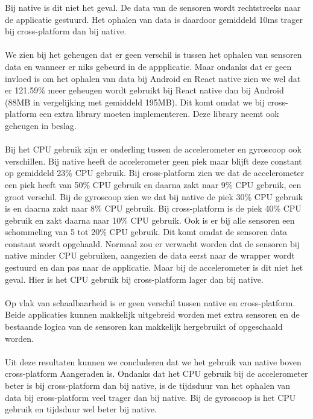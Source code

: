 Bij native is dit niet het geval. De data van de sensoren wordt rechtstreeks naar de applicatie gestuurd.
Het ophalen van data is daardoor gemiddeld 10ms trager bij cross-platform dan bij native.
\\\\
We zien bij het geheugen dat er geen verschil is tussen het ophalen van sensoren data en wanneer er 
niks gebeurd in de appplicatie. Maar ondanks dat er geen invloed is om het ophalen van data bij 
Android en React native zien we wel dat er 121.59\% meer geheugen wordt gebruikt bij React native dan 
bij Android (88MB in vergelijking met gemiddeld 195MB). Dit komt omdat we bij cross-platform een extra 
library moeten implementeren. Deze library neemt ook geheugen in beslag.
\\\\
Bij het CPU gebruik zijn er onderling tussen de accelerometer en gyroscoop ook verschillen. Bij native 
heeft de accelerometer geen piek maar blijft deze constant op gemiddeld 23\% CPU gebruik. Bij cross-platform zien we
dat de accelerometer een piek heeft van 50\% CPU gebruik en daarna zakt naar 9\% CPU gebruik, een groot verschil. 
Bij de gyroscoop zien we dat bij native de piek 30\% CPU gebruik is en daarna zakt naar 8\% CPU gebruik. Bij cross-platform
is de piek 40\% CPU gebruik en zakt daarna naar 10\% CPU gebruik. Ook is er bij alle sensoren een schommeling van 5 tot 20\% 
CPU gebruik. Dit komt omdat de sensoren data constant wordt opgehaald. Normaal zou er verwacht worden dat de sensoren bij native 
minder CPU gebruiken, aangezien de data eerst naar de wrapper wordt gestuurd en dan pas naar de applicatie. Maar bij 
de accelerometer is dit niet het geval. Hier is het CPU gebruik bij cross-platform lager dan bij native.
\\\\
Op vlak van schaalbaarheid is er geen verschil tussen native en cross-platform. Beide applicaties kunnen
makkelijk uitgebreid worden met extra sensoren en de bestaande logica van de sensoren kan makkelijk 
hergebruikt of opgeschaald worden.
\\\\
Uit deze resultaten kunnen we concluderen dat we het gebruik van native boven cross-platform Aangeraden is.
Ondanks dat het CPU gebruik bij de accelerometer beter is bij cross-platform dan bij native, is de tijdsduur
van het ophalen van data bij cross-platform veel trager dan bij native. Bij de gyroscoop is het CPU gebruik en 
tijdsduur wel beter bij native. 














